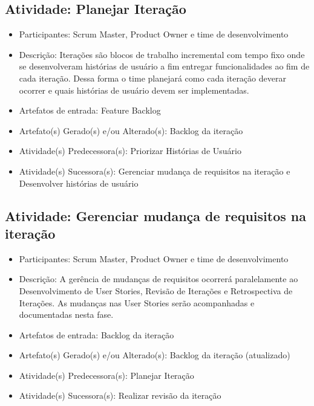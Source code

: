 \subsection{Atividade: Planejar Iteração}
\begin{itemize}
\item Participantes: Scrum Master, Product Owner e time de desenvolvimento

\item Descrição: Iterações são blocos de trabalho incremental com tempo fixo onde se desenvolveram histórias de usuário a fim entregar funcionalidades ao fim de cada iteração. Dessa forma o time planejará como cada iteração deverar ocorrer e quais histórias de usuário devem ser implementadas.

\item Artefatos de entrada: Feature Backlog

\item Artefato(s) Gerado(s) e/ou Alterado(s): Backlog da iteração

\item Atividade(s) Predecessora(s): Priorizar Histórias de Usuário
  
\item Atividade(s) Sucessora(s): Gerenciar mudança de requisitos na iteração e Desenvolver histórias de usuário
\end{itemize}

\subsection{Atividade: Gerenciar mudança de requisitos na iteração}
\begin{itemize}
\item Participantes: Scrum Master, Product Owner e time de desenvolvimento

\item Descrição: A gerência de mudanças de requisitos ocorrerá paralelamente ao Desenvolvimento de User Stories, Revisão de Iterações e Retrospectiva de Iterações. As mudanças nas User Stories serão acompanhadas e documentadas nesta fase.

\item Artefatos de entrada: Backlog da iteração

\item Artefato(s) Gerado(s) e/ou Alterado(s): Backlog da iteração (atualizado)

\item Atividade(s) Predecessora(s): Planejar Iteração
  
\item Atividade(s) Sucessora(s): Realizar revisão da iteração
\end{itemize}

